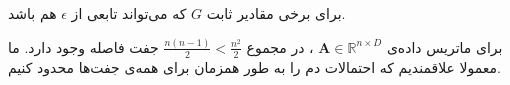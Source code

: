 برای برخی مقادیر ثابت 
$G$
که می‌تواند تابعی از 
$\epsilon$
هم باشد.

برای ماتریس داده‌ی
$\mathbf{A} \in \mathbb{R}^{n \times D}$
، در مجموع 
$\frac{n(n-1)}{2} < \frac{n^2}{2}$
جفت فاصله وجود دارد. ما معمولا علاقمندیم که احتمالات دم را به طور همزمان برای همه‌ی جفت‌ها محدود کنیم. 


























